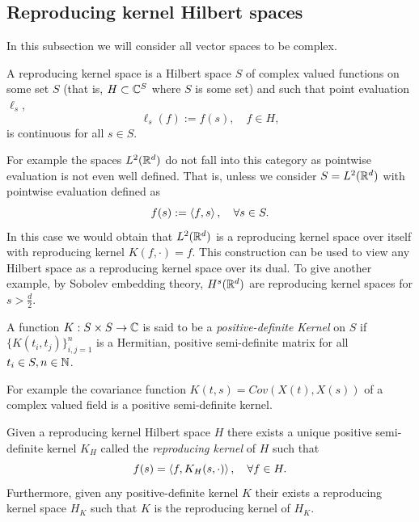 \documentclass[
    a4paper,
    DIV=14,
    abstract=true,
    numbers=noenddot
]{scrartcl}
\begin{document}
\subsection{Reproducing kernel Hilbert spaces}
In this subsection we will consider all vector spaces to be complex.
\begin{definition}
	A reproducing kernel space is a Hilbert space $S$ of complex valued functions on some set $S$ (that is, $H\subset \mathbb{C}^S$ where $S$ is some set) and such that  point evaluation $\ell _s$, $$\ell _s(f):=f(s),\quad f\in H,$$ is continuous for all $s\in S$.
\end{definition}
For example the spaces $L^2(\mathbb{R}^d)$ do not fall into this category as pointwise evaluation is not even well defined. That is, unless we consider $S=L^2(\mathbb{R}^d)$ with pointwise evaluation defined as
\begin{equation*}
	f(s):=\left\langle f,s\right\rangle,\quad\forall s\in S.
\end{equation*}
In this case we would obtain that $L^2(\mathbb{R}^d)$ is a reproducing kernel space over itself with reproducing kernel $K(f,\cdot )=f.$ This construction can be used to view any Hilbert space as a reproducing kernel space over its dual. To give another example, by Sobolev embedding theory, $H^s(\mathbb{R}^d)$ are reproducing kernel spaces for $s>\frac{d}{2}$.
\begin{definition}
	A function $K:S\times S\to \mathbb{C}$ is said to be a \emph{positive-definite  Kernel} on $S$ if  $\{K(t_i,t_j)\}_{i,j=1}^n$ is a Hermitian, positive semi-definite matrix for all $t_i \in S,n \in \mathbb{N}$.
\end{definition}
For example the covariance function $K(t,s)=Cov(X(t),X(s))$ of a complex valued field is a positive semi-definite kernel.
\begin{proposition}\label{existence reproducing kernel}
	Given a reproducing kernel Hilbert space $H$ there exists a unique positive semi-definite kernel $K_H$ called the \emph{reproducing kernel} of $H$ such that
	\begin{equation*}
		f(s)=\left\langle f,K_H(s,\cdot )\right\rangle,\quad\forall f\in H.
	\end{equation*}
	Furthermore, given any positive-definite kernel $K$ their exists a reproducing kernel space $H_K$ such that $K$ is the reproducing kernel of $H_K$.
\end{proposition}
\end{document}
